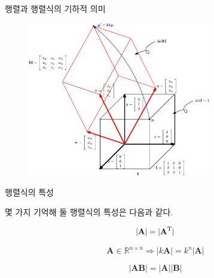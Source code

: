 \begin{frame}{행렬과 행렬식의 기하적 의미}

\begin{figure}
\includegraphics[width=8cm]{Math_matrix/matrixConcept.eps}
\end{figure}

\end{frame}

\begin{frame}{행렬식의 특성}

몇 가지 기억해 둘 행렬식의 특성은 다음과 같다.

$$|\mathbf A| = |\mathbf A^{\rm T}|$$

$$\mathbf A \in \mathbb R^{n \times n} \Rightarrow | k \mathbf A | = k^n |\mathbf A|$$

$$|\mathbf {AB}| = |\mathbf A| |\mathbf B|$$

\end{frame}

